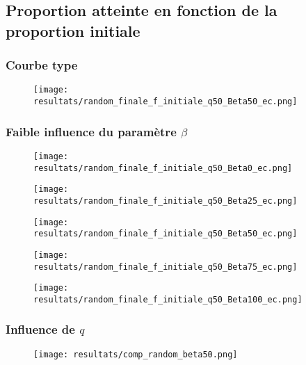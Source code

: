 \documentclass{beamer}
\begin{document}
\subsection{Proportion atteinte en fonction de la proportion initiale}
\begin{frame}
  \frametitle{Courbe type}
  \begin{figure}[H]
  \begin{center}
    \texttt{[image: resultats/random\_finale\_f\_initiale\_q50\_Beta50\_ec.png]}
  \end{center}
  \end{figure}
\end{frame}

\begin{frame}
  \frametitle{Faible influence du paramètre $\beta$}
   {
  \begin{figure}[H]
  \begin{center}
    \texttt{[image: resultats/random\_finale\_f\_initiale\_q50\_Beta0\_ec.png]}
  \end{center}
  \end{figure}
  }
   {
  \begin{figure}[H]
  \begin{center}
    \texttt{[image: resultats/random\_finale\_f\_initiale\_q50\_Beta25\_ec.png]}
  \end{center}
  \end{figure}
  }
   {
  \begin{figure}[H]
  \begin{center}
    \texttt{[image: resultats/random\_finale\_f\_initiale\_q50\_Beta50\_ec.png]}
  \end{center}
  \end{figure}
  }
   {
  \begin{figure}[H]
  \begin{center}
    \texttt{[image: resultats/random\_finale\_f\_initiale\_q50\_Beta75\_ec.png]}
  \end{center}
  \end{figure}
  }
   {
  \begin{figure}[H]
  \begin{center}
    \texttt{[image: resultats/random\_finale\_f\_initiale\_q50\_Beta100\_ec.png]}
  \end{center}
  \end{figure}
  }
\end{frame}

\begin{frame}
  \frametitle{Influence de $q$}
  \begin{figure}[H]
  \begin{center}
    \texttt{[image: resultats/comp\_random\_beta50.png]}
  \end{center}
  \end{figure}
\end{frame}
\end{document}
